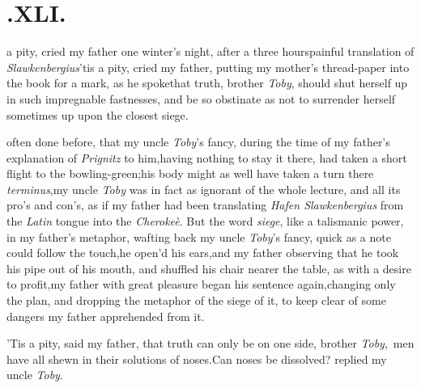 \documentclass{article}
\begin{document}
\vfill


\newpage
\section{.\quad  XLI.}

 a pity, cried my father
one winter’s night, after a three hours\break painful translation
of \textit{Slawkenbergius}\tsk ’tis a pity, cried my
father, putting my mother’s thread-paper into the book for a
mark, as he spoke\tsh that truth, bro\-ther \textit{Toby},
should shut herself up in such impregnable fastnesses, and be so
obstinate as not to surrender herself sometimes up upon the closest
siege.\tsh

\noindent
{} often
done before, that my uncle \textit{Toby}’s fancy, during the
time of my father’s explanation of \textit{Prignitz} to
him,\tsh having nothing to stay it there, had taken a short
flight to the bowling-green;\tsh his body might as well have
taken a turn there
\textit{terminus},\tsh my uncle \textit{Toby} was in fact\break
as ignorant
of the whole lecture, and all its pro’s and con’s, as if my
father had been translating \textit{Hafen Slawkenbergius}\break
from the \textit{Latin} tongue into the \textit{Cherokeè}.
But the word \textit{siege}, like a talismanic\break
power, in my
father’s metaphor, wafting back my uncle \textit{Toby}’s
fancy, quick as a note could follow the touch,\tsk he open’d
his ears,\tsk and my father observing that he took his pipe
out of his mouth, and shuffled his chair nearer the table,
as with a desire to profit,\tsk my father with great
pleasure began his sentence again,\tsh changing only the
plan, and dropping the metaphor of the siege of it, to keep
clear of some dangers my father apprehended from it.

\smallskip
{}

\newpage
’Tis a pity, said my father, that truth can only be on one
side, brother \textit{Toby},\,\tsk\break
{}
men have all shewn in their solutions of
noses.\tsh Can noses be dissolved? repli\-ed my uncle
\textit{Toby}.\tsh
\end{document}
